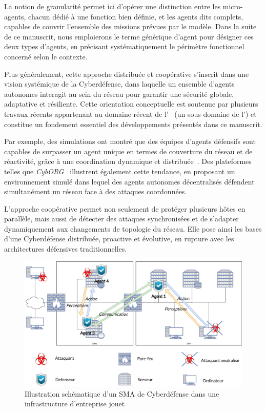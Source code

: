 La notion de granularité permet ici d'opérer une distinction entre les micro-agents, chacun dédié à une fonction bien définie, et les agents  dits complets, capables de couvrir l'ensemble des missions prévues par le modèle. Dans la suite de ce manuscrit, nous emploierons le terme générique d'agent  pour désigner ces deux types d'agents, en précisant systématiquement le périmètre fonctionnel concerné selon le contexte.

Plus généralement, cette approche distribuée et coopérative s'inscrit dans une vision systémique de la Cyberdéfense, dans laquelle un ensemble d'agents autonomes interagit au sein du réseau pour garantir une sécurité globale, adaptative et résiliente. Cette orientation conceptuelle est soutenue par plusieurs travaux récents appartenant au domaine récent de l'~\cite{Vyas2023} (un sous domaine de l') et constitue un fondement essentiel des développements présentés dans ce manuscrit.

Par exemple, des simulations ont montré que des équipes d'agents défensifs sont capables de surpasser un agent unique en termes de couverture du réseau et de réactivité, grâce à une coordination dynamique et distribuée~\cite{RLResilientCyberdefense2024}.
Des plateformes telles que \textit{CybORG}~\cite{cage_challenge_3_announcement} illustrent également cette tendance, en proposant un environnement simulé dans lequel des agents autonomes décentralisés défendent simultanément un réseau face à des attaques coordonnées.

L'approche coopérative permet non seulement de protéger plusieurs hôtes en parallèle, mais aussi de détecter des attaques synchronisées et de s'adapter dynamiquement aux changements de topologie du réseau. Elle pose ainsi les bases d'une Cyberdéfense distribuée, proactive et évolutive, en rupture avec les architectures défensives traditionnelles.

\begin{figure}[h]
  \centering
  \includegraphics[width=\linewidth]{figures/infra_MAS_illustration.pdf}
  \caption{Illustration schématique d'un SMA de Cyberdéfense dans une infrastructure d'entreprise jouet}
  \label{fig:distributed_sma}
\end{figure}

